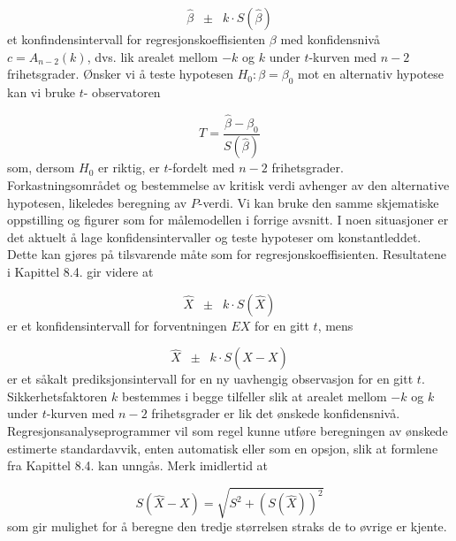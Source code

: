 \[      \hat{\beta} \;\; \pm \;\; k\cdot S(\hat{\beta})\]
et konfindensintervall for regresjonskoeffisienten $\beta$ med
konfidensnivå $c=A_{n-2}(k)$, dvs. lik arealet mellom $-k$ og $k$
under $t$-kurven med $n-2$ frihetsgrader. Ønsker vi å teste hypotesen
$H_0:\beta ={\beta}_0$ mot en alternativ hypotese kan vi bruke $t$-
observatoren

\[   T=\frac{\hat{\beta}-{\beta_0}}{S(\hat{\beta})}\]
som, dersom $H_0$ er riktig, er $t$-fordelt med $n-2$
frihetsgrader. Forkastningsområdet og bestemmelse av kritisk
verdi avhenger av den alternative hypotesen, likeledes beregning
av $P$-verdi. Vi kan bruke den samme skjematiske oppstilling og
figurer som for målemodellen i forrige avsnitt. I noen
situasjoner er det aktuelt å lage konfidensintervaller og
teste hypoteser om konstantleddet. Dette kan gjøres på
tilsvarende måte som for regresjons\-koeffisienten. Resultatene
i Kapittel 8.4. gir videre at

\[   \hat{X} \;\; \pm \;\; k\cdot S(\hat{X})\]
er et konfidensintervall for forventningen $EX$ for en gitt $t$, mens 

\[   \hat{X} \;\; \pm \;\; k\cdot S(\hat{X}-X)\]
er et såkalt prediksjonsintervall for en ny uavhengig
observasjon for en gitt $t$.  Sikkerhetsfaktoren $k$ bestemmes i
begge tilfeller slik at arealet mellom $-k$ og $k$ under $t$-kurven
med $n-2$ frihetsgrader er lik det ønskede konfidensnivå.
Regresjonsanalyseprogrammer vil som regel kunne utføre
beregningen av ønskede estimerte standardavvik, enten
automatisk eller som en opsjon, slik at formlene fra Kapittel
8.4. kan unngås. 
Merk imidlertid at

\[ S(\hat X - X)=\sqrt{S^2+(S(\hat X))^2}\]
som gir mulighet for å beregne den tredje størrelsen
straks de to øvrige er kjente.\\

